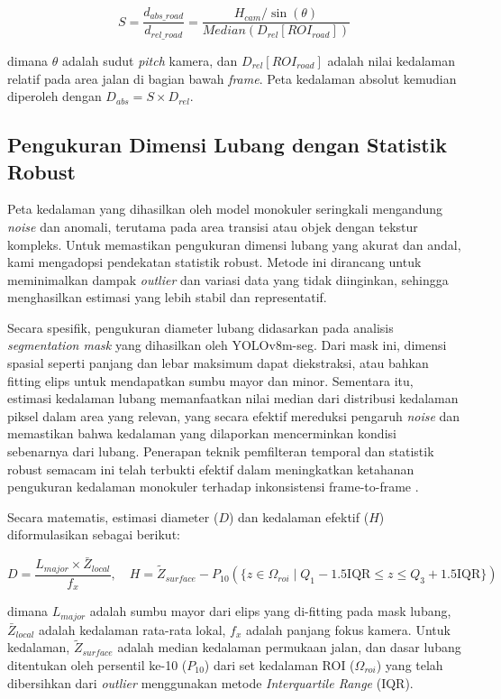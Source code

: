 \documentclass{iopjournal}
\begin{document}
\begin{equation}
S = \frac{d_{abs\_road}}{d_{rel\_road}} = \frac{H_{cam} / \sin(\theta)}{Median(D_{rel}[ROI_{road}])}
\end{equation}

dimana $\theta$ adalah sudut \textit{pitch} kamera, dan $D_{rel}[ROI_{road}]$ adalah nilai kedalaman relatif pada area jalan di bagian bawah \textit{frame}. Peta kedalaman absolut kemudian diperoleh dengan $D_{abs} = S \times D_{rel}$.

\subsection{Pengukuran Dimensi Lubang dengan Statistik Robust}
Peta kedalaman yang dihasilkan oleh model monokuler seringkali mengandung \textit{noise} dan anomali, terutama pada area transisi atau objek dengan tekstur kompleks. Untuk memastikan pengukuran dimensi lubang yang akurat dan andal, kami mengadopsi pendekatan statistik robust. Metode ini dirancang untuk meminimalkan dampak \textit{outlier} dan variasi data yang tidak diinginkan, sehingga menghasilkan estimasi yang lebih stabil dan representatif.

Secara spesifik, pengukuran diameter lubang didasarkan pada analisis \textit{segmentation mask} yang dihasilkan oleh YOLOv8m-seg. Dari mask ini, dimensi spasial seperti panjang dan lebar maksimum dapat diekstraksi, atau bahkan fitting elips untuk mendapatkan sumbu mayor dan minor. Sementara itu, estimasi kedalaman lubang memanfaatkan nilai median dari distribusi kedalaman piksel dalam area yang relevan, yang secara efektif mereduksi pengaruh \textit{noise} dan memastikan bahwa kedalaman yang dilaporkan mencerminkan kondisi sebenarnya dari lubang. Penerapan teknik pemfilteran temporal dan statistik robust semacam ini telah terbukti efektif dalam meningkatkan ketahanan pengukuran kedalaman monokuler terhadap inkonsistensi frame-to-frame \cite{wang2025}.

Secara matematis, estimasi diameter ($D$) dan kedalaman efektif ($H$) diformulasikan sebagai berikut:

\begin{equation}
D = \frac{L_{major} \times \bar{Z}_{local}}{f_x}, \quad H = \tilde{Z}_{surface} - P_{10}(\{z \in \Omega_{roi} \mid Q_1 - 1.5 \text{IQR} \le z \le Q_3 + 1.5 \text{IQR}\})
\end{equation}

dimana $L_{major}$ adalah sumbu mayor dari elips yang di-fitting pada mask lubang, $\bar{Z}_{local}$ adalah kedalaman rata-rata lokal, $f_x$ adalah panjang fokus kamera. Untuk kedalaman, $\tilde{Z}_{surface}$ adalah median kedalaman permukaan jalan, dan dasar lubang ditentukan oleh persentil ke-10 ($P_{10}$) dari set kedalaman ROI ($\Omega_{roi}$) yang telah dibersihkan dari \textit{outlier} menggunakan metode \textit{Interquartile Range} (IQR).
\end{document}

